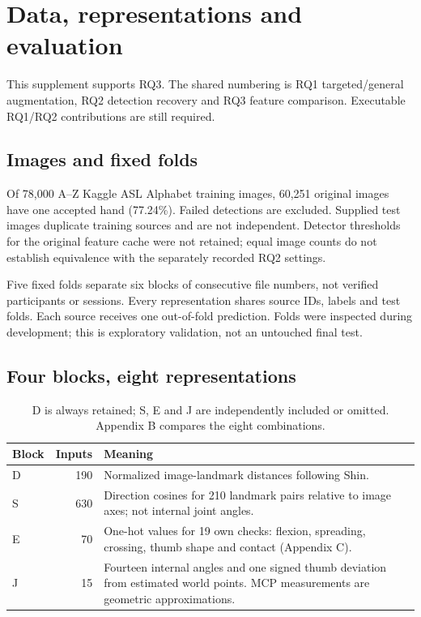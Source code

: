 \section{Data, representations and evaluation}\label{app:protocol}
This supplement supports RQ3. The shared numbering is RQ1 targeted/general augmentation, RQ2 detection recovery and RQ3 feature comparison. Executable RQ1/RQ2 contributions are still required.

\subsection{Images and fixed folds}
Of 78,000 A--Z Kaggle ASL Alphabet training images, 60,251 original images have one accepted hand (77.24\%). Failed detections are excluded. Supplied test images duplicate training sources and are not independent. Detector thresholds for the original feature cache were not retained; equal image counts do not establish equivalence with the separately recorded RQ2 settings.

Five fixed folds separate six blocks of consecutive file numbers, not verified participants or sessions. Every representation shares source IDs, labels and test folds. Each source receives one out-of-fold prediction. Folds were inspected during development; this is exploratory validation, not an untouched final test.

\subsection{Four blocks, eight representations}
\begin{table}[h]\centering\small
\caption{D is always retained; S, E and J are independently included or omitted. Appendix B compares the eight combinations.}
\begin{tabular}{lrp{.72\linewidth}}\toprule
Block & Inputs & Meaning\\\midrule
D & 190 & Normalized image-landmark distances following Shin.\\
S & 630 & Direction cosines for 210 landmark pairs relative to image axes; not internal joint angles.\\
E & 70 & One-hot values for 19 own checks: flexion, spreading, crossing, thumb shape and contact (Appendix C).\\
J & 15 & Fourteen internal angles and one signed thumb deviation from estimated world points. MCP measurements are geometric approximations.\\\bottomrule
\end{tabular}\end{table}

